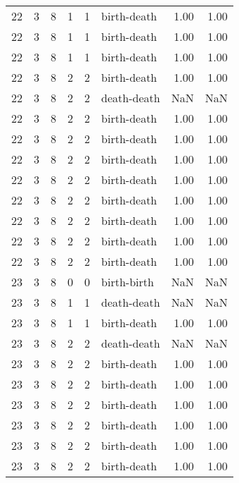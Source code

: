 \documentclass{article}
\begin{document}
\begin{center}
\begin{tabular}{rrrrrlrr}
22 & 3 & 8 & 1 & 1 & birth-death & 1.00 & 1.00 \\
22 & 3 & 8 & 1 & 1 & birth-death & 1.00 & 1.00 \\
22 & 3 & 8 & 1 & 1 & birth-death & 1.00 & 1.00 \\
22 & 3 & 8 & 2 & 2 & birth-death & 1.00 & 1.00 \\
22 & 3 & 8 & 2 & 2 & death-death & NaN & NaN \\
22 & 3 & 8 & 2 & 2 & birth-death & 1.00 & 1.00 \\
22 & 3 & 8 & 2 & 2 & birth-death & 1.00 & 1.00 \\
22 & 3 & 8 & 2 & 2 & birth-death & 1.00 & 1.00 \\
22 & 3 & 8 & 2 & 2 & birth-death & 1.00 & 1.00 \\
22 & 3 & 8 & 2 & 2 & birth-death & 1.00 & 1.00 \\
22 & 3 & 8 & 2 & 2 & birth-death & 1.00 & 1.00 \\
22 & 3 & 8 & 2 & 2 & birth-death & 1.00 & 1.00 \\
22 & 3 & 8 & 2 & 2 & birth-death & 1.00 & 1.00 \\
23 & 3 & 8 & 0 & 0 & birth-birth & NaN & NaN \\
23 & 3 & 8 & 1 & 1 & death-death & NaN & NaN \\
23 & 3 & 8 & 1 & 1 & birth-death & 1.00 & 1.00 \\
23 & 3 & 8 & 2 & 2 & death-death & NaN & NaN \\
23 & 3 & 8 & 2 & 2 & birth-death & 1.00 & 1.00 \\
23 & 3 & 8 & 2 & 2 & birth-death & 1.00 & 1.00 \\
23 & 3 & 8 & 2 & 2 & birth-death & 1.00 & 1.00 \\
23 & 3 & 8 & 2 & 2 & birth-death & 1.00 & 1.00 \\
23 & 3 & 8 & 2 & 2 & birth-death & 1.00 & 1.00 \\
23 & 3 & 8 & 2 & 2 & birth-death & 1.00 & 1.00 \\
\bottomrule
\end{tabular}


\end{center}
\end{document}
